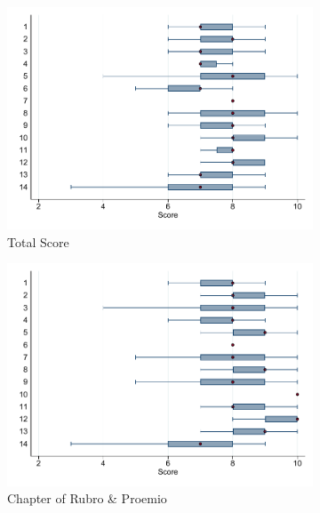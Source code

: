 \documentclass[oneside,11pt]{article}
\begin{document}
\begin{figure}[H] 
    \label{}
    \caption{Lawyer fixed effects, controlling for variables of the case}
     \begin{center}
      \begin{subfigure}{0.49\textwidth}
        \caption{Total Score}
        \centering
        \includegraphics[width=\textwidth]{Figuras/boxplot_total.pdf}
    \end{subfigure}
    \begin{subfigure}{0.49\textwidth}
        \caption{Chapter of Rubro \& Proemio}
        \centering
        \includegraphics[width=\textwidth]{Figuras/boxplot_calif_rubro_proemio.pdf}
    \end{subfigure}
    \begin{subfigure}{0.49\textwidth}

\end{subfigure}
\end{center}
\end{figure}
\end{document}
